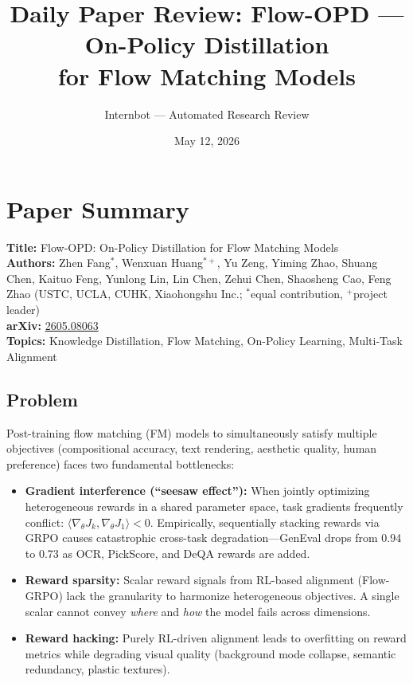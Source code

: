 \documentclass[11pt]{article}
\title{Daily Paper Review: Flow-OPD --- On-Policy Distillation\\for Flow Matching Models}
\author{Internbot --- Automated Research Review}
\date{May 12, 2026}
\begin{document}
\maketitle

\section{Paper Summary}

\textbf{Title:} Flow-OPD: On-Policy Distillation for Flow Matching Models \\
\textbf{Authors:} Zhen Fang$^*$, Wenxuan Huang$^{*+}$, Yu Zeng, Yiming Zhao, Shuang Chen, Kaituo Feng, Yunlong Lin, Lin Chen, Zehui Chen, Shaosheng Cao, Feng Zhao (USTC, UCLA, CUHK, Xiaohongshu Inc.; $^*$equal contribution, $^+$project leader) \\
\textbf{arXiv:} \href{https://arxiv.org/abs/2605.08063}{2605.08063} \\
\textbf{Topics:} Knowledge Distillation, Flow Matching, On-Policy Learning, Multi-Task Alignment

\subsection{Problem}

Post-training flow matching (FM) models to simultaneously satisfy multiple objectives (compositional accuracy, text rendering, aesthetic quality, human preference) faces two fundamental bottlenecks:

\begin{itemize}
    \item \textbf{Gradient interference (``seesaw effect''):} When jointly optimizing heterogeneous rewards in a shared parameter space, task gradients frequently conflict: $\langle \nabla_\theta J_k, \nabla_\theta J_1 \rangle < 0$. Empirically, sequentially stacking rewards via GRPO causes catastrophic cross-task degradation---GenEval drops from 0.94 to 0.73 as OCR, PickScore, and DeQA rewards are added.
    \item \textbf{Reward sparsity:} Scalar reward signals from RL-based alignment (Flow-GRPO) lack the granularity to harmonize heterogeneous objectives. A single scalar cannot convey \emph{where} and \emph{how} the model fails across dimensions.
    \item \textbf{Reward hacking:} Purely RL-driven alignment leads to overfitting on reward metrics while degrading visual quality (background mode collapse, semantic redundancy, plastic textures).
\end{itemize}
\end{document}
